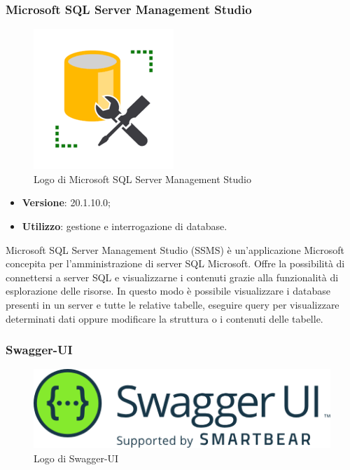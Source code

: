 \subsubsection{Microsoft SQL Server Management Studio}

\begin{figure}[H]
    \centering 
    \includegraphics[width=0.3\columnwidth]{images/loghi/sql_server.png} 
    \caption{Logo di Microsoft SQL Server Management Studio}
\end{figure}

\begin{itemize}
    \item \textbf{Versione}: 20.1.10.0;
    \item \textbf{Utilizzo}: gestione e interrogazione di database.
\end{itemize}
Microsoft SQL Server Management Studio (SSMS) è un'applicazione Microsoft concepita per l'amministrazione di server SQL Microsoft. Offre la possibilità di connettersi a server SQL e visualizzarne i contenuti grazie alla funzionalità di esplorazione delle risorse. In questo modo è possibile visualizzare i database presenti in un server e tutte le relative tabelle, eseguire query per visualizzare determinati dati oppure modificare la struttura o i contenuti delle tabelle.

\subsubsection{Swagger-UI}

\begin{figure}[H]
    \centering 
    \includegraphics[width=0.4\columnwidth]{images/loghi/swagger.png} 
    \caption{Logo di Swagger-UI}
\end{figure}

